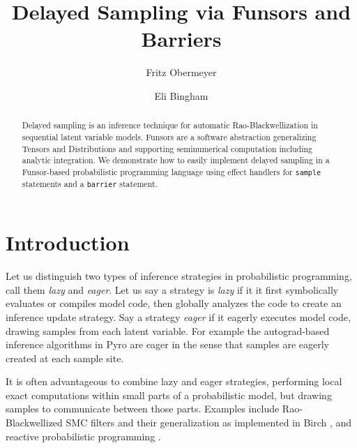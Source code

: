 \documentclass[anonymous=false, %
               format=acmsmall, %
               review=true, %
               screen=true, %
               nonacm=true]{acmart}
\begin{document}
\title{Delayed Sampling via Funsors and Barriers}

\author{Fritz Obermeyer}

\author{Eli Bingham}

\begin{abstract}
Delayed sampling is an inference technique for automatic Rao-Blackwellization in sequential latent variable models.
Funsors are a software abstraction generalizing Tensors and Distributions and supporting seminumerical computation including analytic integration.
We demonstrate how to easily implement delayed sampling in a Funsor-based probabilistic programming language using effect handlers for \texttt{sample} statements and a \texttt{barrier} statement.
\end{abstract}

\maketitle

\section{Introduction}

Let us distinguish two types of inference strategies in probabilistic programming, call them \emph{lazy} and \emph{eager}.
Let us say a strategy is \emph{lazy} if it it first symbolically evaluates or compiles model code, then globally analyzes the code to create an inference update strategy.
Say a strategy \emph{eager} if it eagerly executes model code, drawing samples from each latent variable.
For example the autograd-based inference algorithms in Pyro \cite{bingham2018pyro} are eager in the sense that samples are eagerly created at each sample site.

It is often advantageous to combine lazy and eager strategies, performing local exact computations within small parts of a probabilistic model, but drawing samples to communicate between those parts.
Examples include Rao-Blackwellized SMC filters and their generalization as implemented in Birch \cite{murray2017delayed}, and reactive probabilistic programming \cite{baudart2019reactive}.
\end{document}
